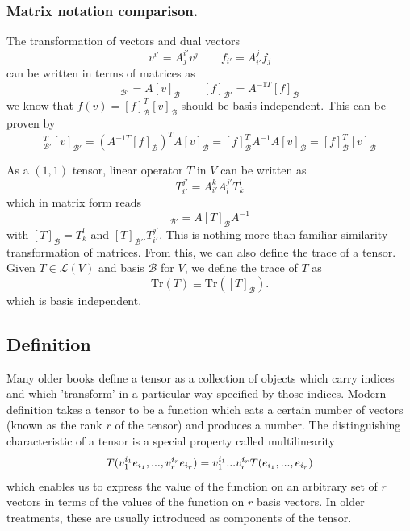 \documentclass[../../../main.tex]{subfiles}
\begin{document}
\subsubsection{Matrix notation comparison.}
The transformation of vectors and dual vectors
\begin{equation*}
  v^{i'} = A^{i'}_{j} v^{j}\qquad
  f_{i'} = A^{j}_{i'} f_{j}
\end{equation*}
can be written in terms of matrices as
\begin{equation*}
  [v]_{\mathcal{B}'} = A [v]_{\mathcal{B}}\qquad
  [f]_{\mathcal{B}'} = A^{-1 T} [f]_{\mathcal{B}}
\end{equation*}
we know that $f (v)=[f]_\mathcal{B}^T [v]_\mathcal{B}$ should be basis-independent.
This can be proven by
\begin{equation*}
  [f]_{\mathcal{B'}}^{T} [v]_{\mathcal{B'}} = (A^{-1T}[f]_{\mathcal{B}})^{T} A [v]_{\mathcal{B}}
    = [f]_{\mathcal{B}}^{T} A^{-1} A [v]_{\mathcal{B}}
    = [f]_{\mathcal{B}}^{T} [v]_{\mathcal{B}}
\end{equation*}

As a $(1,1)$ tensor, linear operator $T$ in $V$ can be written as
\begin{equation*}
  T_{i'}^{j'} = A_{i'}^{k} A_{l}^{j'} T_{k}^{l}
\end{equation*}
which in matrix form reads
\begin{equation*}
  [T]_{\mathcal{B}'} = A [T]_{\mathcal{B}} A^{-1}
\end{equation*}
with $[T]_\mathcal{B}=T_{k}^{l}$ and $[T]_{\mathcal{B'}'}T_{i'}^{j'}$.
This is nothing more than familiar similarity transformation of matrices.
From this, we can also define the trace of a tensor.
Given $T \in \mathcal{L}(V)$ and basis $\mathcal{B}$ for $V$, we define the trace of $T$ as
\begin{equation*}
  \mathrm{Tr}(T) \equiv \mathrm{Tr}([T]_{\mathcal{B}}).
\end{equation*}
which is basis independent.

\subsection{Definition}
Many older books define a tensor as a collection of objects which carry indices and which 'transform' in a particular way specified by those indices.
Modern  definition takes a tensor to be a function which eats a certain number of vectors (known as the rank $r$ of the tensor) and produces a number.
The distinguishing characteristic of a tensor is a special property called multilinearity
\begin{equation*}
  T(v_1^{i_1} e_{i_1}, ..., v_r^{i_r} e_{i_r})
  =  v_{1}^{i_{1}}...v_{r}^{i_{r}} T(e_{i_{1}}, ..., e_{i_{r}}) \\
\end{equation*}
which enables us to express the value of the function on an arbitrary set of $r$ vectors in terms of the values of the function on $r$ basis vectors.
In older treatments, these are usually introduced as components of the tensor.
\end{document}
